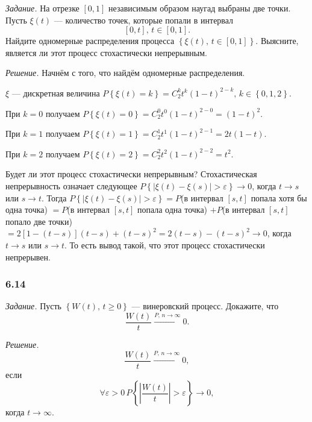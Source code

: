 \textit{Задание.}
На отрезке $ \left[ 0, 1 \right] $ независимым образом наугад выбраны две точки.
Пусть $ \xi \left( t \right) $ --- количество точек,
которые попали в интервал
$$ \left[ 0, t \right], \,
  t \in \left[ 0, 1 \right].$$
Найдите одномерные распределения процесса
$ \left\{ \xi \left( t \right), \, t \in \left[ 0, 1 \right] \right\} $.
Выясните, является ли этот процесс стохастически непрерывным.

\textit{Решение.}
Начнём с того, что найдём одномерные распределения.

$ \xi $ --- дискретная величина
$P \left\{ \xi \left( t \right) = k \right\} = C_2^k t^k \left( 1 - t \right)^{2 - k}, \,
  k \in \left\{ 0, 1, 2 \right\} $.

При $k = 0$ получаем
$P \left\{ \xi \left( t \right) = 0 \right\} =
  C_2^0 t^0 \left( 1 - t \right)^{2 - 0} =
  \left( 1 - t \right)^2$.

При $k = 1$ получаем
$P \left\{ \xi \left( t \right) = 1 \right\} =
  C_2^1 t^1 \left( 1 - t \right)^{2 - 1} =
  2t \left( 1 - t \right) $.

При $k = 2$ получаем
$P \left\{ \xi \left( t \right) = 2 \right\} =
  C_2^2 t^2 \left( 1 - t \right)^{2 - 2} =
  t^2$.

Будет ли этот процесс стохастически непрерывным?
Стохастическая непрерывность означает следующее
$P \left\{ \left| \xi \left( t \right) - \xi \left( s \right) \right| > \varepsilon \right\} \to
  0$,
когда $t \to s$ или $s \to t$.
Тогда
$P \left\{ \left| \xi \left( t \right) - \xi \left( s \right) \right| > \varepsilon \right\} =
  P$(в интервал $ \left[ s, t \right] $ попала хотя бы одна точка) $=
  P$(в интервал $ \left[ s, t \right] $ попала одна точка) $+
  P$(в интервал $ \left[ s, t \right] $ попало две точки) $=
  2 \left[ 1 - \left( t - s \right) \right] \left( t - s \right) + \left( t - s \right)^2 =
  2 \left( t - s \right) - \left( t - s \right)^2 \to
  0$,
когда $t \to s$ или $s \to t$.
То есть вывод такой, что этот процесс стохастически непрерывен.

\subsubsection*{6.14}

\textit{Задание.}
Пусть $ \left\{ W \left( t \right), \, t \geq 0 \right\} $ --- винеровский процесс.
Докажите, что
$$ \frac{W \left( t \right) }{t} \overset{P, \, n \to \infty }{ \to }
  0.$$

\textit{Решение.}
$$ \frac{W \left( t \right) }{t} \overset{P, \, n \to \infty }{ \to }
  0,$$
если
$$ \forall \varepsilon > 0 \,
  P \left\{ \left| \frac{W \left( t \right) }{t} \right| > \varepsilon \right\} \to 0,$$
когда $t \to \infty $.

